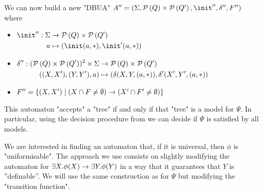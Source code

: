 \documentclass{article}
\begin{document}
We can now build a new "DBUA" $A'' = (\Sigma, \parts Q \times \parts {Q'}, \init'', \delta'', F'')$ where
\begin{itemize}
	\item$\begin{aligned}[t]
			      \init'' : \Sigma & \to      \parts Q \times \parts {Q'} \\
			      a                & \mapsto  ( \init(a,*) , \init'(a,*))
		      \end{aligned}$

	\item$\begin{aligned}[t]
			      \delta'' : (\mathcal{P}\left(Q\right) \times \mathcal{P}\left(Q'\right))^2 \times \Sigma & \to      \mathcal{P}\left(Q\right) \times \mathcal{P}\left(Q'\right)             \\
			      ((X,X'),(Y,Y'),a)                                        & \mapsto (\delta(X,Y,(a,*)), \delta'(X',Y',(a,*))
		      \end{aligned}$

	\item $F'' = \left\{(X,X') \mid (X \cap F \neq \emptyset) \rightarrow (X' \cap F' \neq \emptyset)\right\}$
\end{itemize}
This automaton "accepts" a "tree" if and only if that "tree" is a model for $\Psi$. In particular, using the decision procedure
from  we can decide if $\Psi$ is satisfied by all models.

We are interested in finding an automaton that, if it is universal, then $\phi$ is "uniformisable". The approach we use consists on slightly modifying
the automaton for $\exists X. \phi(X) \rightarrow \exists Y. \phi (Y)$ in a way that it guarantees that $Y$ is ''definable''. We will use the same construction as for $\Psi$ but modifying
the "transition function".
\end{document}
